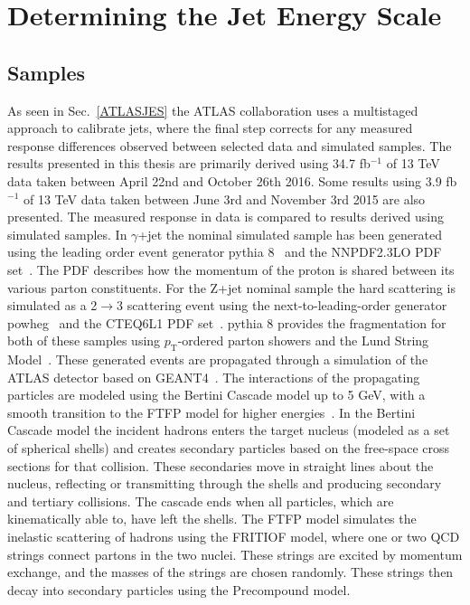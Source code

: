 \chapter{Determining the Jet Energy Scale}
\label{JES2}

\section{Samples}
As seen in Sec.~\ref{ATLASJES} the ATLAS collaboration uses a multistaged approach to calibrate jets, where the final step corrects for any measured response differences observed between selected data and simulated samples.  
The results presented in this thesis are primarily derived using 34.7 fb$^{-1}$ of 13 TeV data taken between April 22nd and October 26th 2016. 
Some results using 3.9 fb$^{-1}$ of 13 TeV data taken between June 3rd and November 3rd 2015 are also presented.  
The measured response in data is compared to results derived using simulated samples.  
In $\gamma$+jet the nominal simulated sample has been generated using the leading order event generator {\sc pythia} 8~\cite{Sjostrand:2007gs} and the NNPDF2.3LO \gls{PDF} set~\cite{Ball:2013hta}.  
The PDF describes how the momentum of the proton is shared between its various parton constituents.  
For the Z+jet nominal sample the hard scattering is simulated as a 2$\rightarrow$3 scattering event using the next-to-leading-order generator {\sc powheg}~\cite{Nason:2004rx, Frixione:2007vw, Alioli:2010xd} and the CTEQ6L1 PDF set~\cite{Pumplin:2002vw}.   
{\sc pythia} 8 provides the fragmentation for both of these samples using $p_{\mathrm T}$-ordered parton showers and the Lund String Model~\cite{ANDERSSON198331}.  
These generated events are propagated through a simulation of the ATLAS detector based on GEANT4~\cite{GEANT4}.  
The interactions of the propagating particles are modeled using the Bertini Cascade model up to 5 GeV, with a smooth transition to the FTFP model for higher energies~\cite{GEANT4Man}.  
In the Bertini Cascade model the incident hadrons enters the target nucleus (modeled as a set of spherical shells) and creates secondary particles based on the free-space cross sections for that collision.  
These secondaries move in straight lines about the nucleus, reflecting or transmitting through the shells and producing secondary and tertiary collisions.  
The cascade ends when all particles, which are kinematically able to, have left the shells.  
The FTFP model simulates the inelastic scattering of hadrons using the FRITIOF model, where one or two QCD strings connect partons in the two nuclei.  
These strings are excited by momentum exchange, and the masses of the strings are chosen randomly.  
These strings then decay into secondary particles using the Precompound model.  
 



